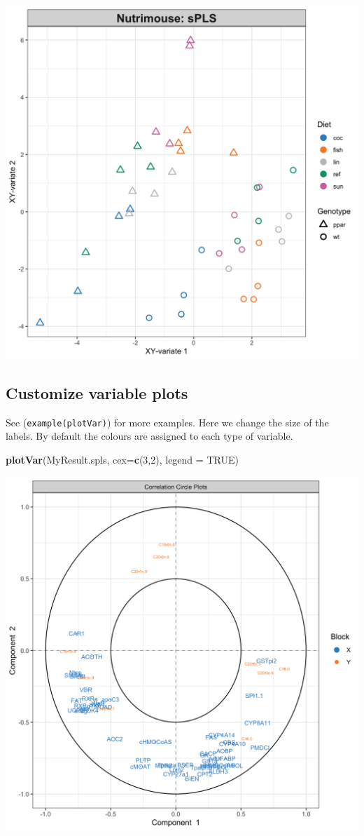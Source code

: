 \documentclass[]{book}
\newenvironment{Shaded}{\begin{snugshade}}{\end{snugshade}}
\newcommand{\DataTypeTok}[1]{\textcolor[rgb]{0.13,0.29,0.53}{#1}}
\newcommand{\DecValTok}[1]{\textcolor[rgb]{0.00,0.00,0.81}{#1}}
\newcommand{\KeywordTok}[1]{\textcolor[rgb]{0.13,0.29,0.53}{\textbf{#1}}}
\newcommand{\NormalTok}[1]{#1}
\newcommand{\OtherTok}[1]{\textcolor[rgb]{0.56,0.35,0.01}{#1}}
\begin{document}
\begin{center}\includegraphics[width=0.75\linewidth,]{Figures/05-pls-plotIndiv-2-1} \end{center}

\hypertarget{pls:plotVar}{%
\subsection{Customize variable plots}\label{pls:plotVar}}

See (\texttt{example(plotVar)}) for more examples. Here we change the size of the labels. By default the colours are assigned to each type of variable.

\begin{Shaded}
\begin{Highlighting}[]
\KeywordTok{plotVar}\NormalTok{(MyResult.spls, }\DataTypeTok{cex=}\KeywordTok{c}\NormalTok{(}\DecValTok{3}\NormalTok{,}\DecValTok{2}\NormalTok{), }\DataTypeTok{legend =} \OtherTok{TRUE}\NormalTok{)}
\end{Highlighting}
\end{Shaded}

\begin{center}\includegraphics[width=0.75\linewidth,]{Figures/05-pls-plotVar-1-1} \end{center}
\end{document}
